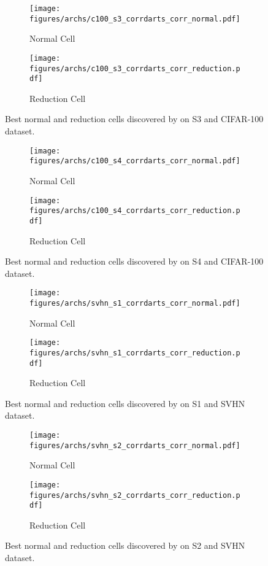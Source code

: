 \documentclass{article} \usepackage{fancyhdr, iclr2023_conference, times}
\begin{document}
\begin{figure}[h]
    \centering
    \begin{subfigure}[h]{0.5\textwidth}
        \centering
        \texttt{[image: figures/archs/c100\_s3\_corrdarts\_corr\_normal.pdf]}
        \caption{Normal Cell}
    \end{subfigure}\begin{subfigure}[h]{0.5\textwidth}
        \centering
        \texttt{[image: figures/archs/c100\_s3\_corrdarts\_corr\_reduction.pdf]}
        \caption{Reduction Cell}
    \end{subfigure}
    \caption{Best normal and reduction cells discovered by  on S3 and CIFAR-100 dataset.}
\end{figure}
\begin{figure}[h]
    \centering
    \begin{subfigure}[h]{0.5\textwidth}
        \centering
        \texttt{[image: figures/archs/c100\_s4\_corrdarts\_corr\_normal.pdf]}
        \caption{Normal Cell}
    \end{subfigure}\begin{subfigure}[h]{0.5\textwidth}
        \centering
        \texttt{[image: figures/archs/c100\_s4\_corrdarts\_corr\_reduction.pdf]}
        \caption{Reduction Cell}
    \end{subfigure}
    \caption{Best normal and reduction cells discovered by  on S4 and CIFAR-100 dataset.}
\end{figure}
\begin{figure}[h]
    \centering
    \begin{subfigure}[h]{0.5\textwidth}
        \centering
        \texttt{[image: figures/archs/svhn\_s1\_corrdarts\_corr\_normal.pdf]}
        \caption{Normal Cell}
    \end{subfigure}\begin{subfigure}[h]{0.5\textwidth}
        \centering
        \texttt{[image: figures/archs/svhn\_s1\_corrdarts\_corr\_reduction.pdf]}
        \caption{Reduction Cell}
    \end{subfigure}
    \caption{Best normal and reduction cells discovered by  on S1 and SVHN dataset.}
\end{figure}
\begin{figure}[h]
    \centering
    \begin{subfigure}[h]{0.5\textwidth}
        \centering
        \texttt{[image: figures/archs/svhn\_s2\_corrdarts\_corr\_normal.pdf]}
        \caption{Normal Cell}
    \end{subfigure}\begin{subfigure}[h]{0.5\textwidth}
        \centering
        \texttt{[image: figures/archs/svhn\_s2\_corrdarts\_corr\_reduction.pdf]}
        \caption{Reduction Cell}
    \end{subfigure}
    \caption{Best normal and reduction cells discovered by  on S2 and SVHN dataset.}
\end{figure}
\end{document}
